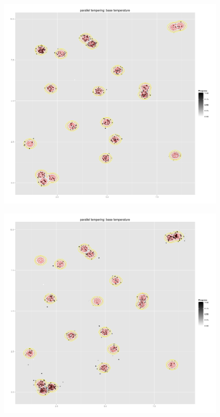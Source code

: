 \begin{figure}
	\begin{minipage}[b]{.5\linewidth}
		\centering \includegraphics[width=\textwidth, keepaspectratio=true]{./img/strat1with2000it.png}
		\label{plotStrategy1}
	\end{minipage}%
	\begin{minipage}[b]{.5\linewidth}
		\centering \includegraphics[width=\textwidth, keepaspectratio=true]{./img/strat2it2000.png}		

\end{minipage}
\end{figure}
